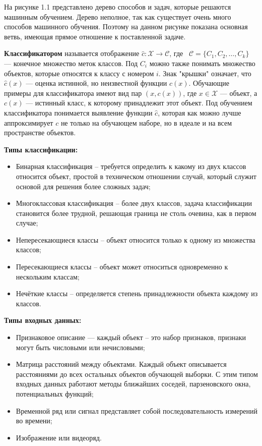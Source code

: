 На рисунке 1.1 представлено дерево способов и задач, которые решаются машинным обучением. Дерево неполное, так как существует очень много способов машинного обучения. Поэтому на данном рисунке показана основная ветвь, имеющая прямое отношение к поставленной задаче.

\textbf{Классификатором} называется отображение $\widehat{c}: \mathcal{X} \to \mathcal{C}$, где 
\
$\mathcal{C} = \{C_{1}, C_{2}, \dots, C_{k}\}$ — конечное множество меток классов. Под $C_{i}$ можно также понимать множество объектов, которые относятся к классу с номером $i$. Знак "крышки" означает, что $\widehat{c}(x)$ — оценка истинной, но неизвестной функции $c(x)$. Обучающие примеры для классификатора имеют вид пар $(x,c(x))$, где $x \in \mathcal{X}$ — объект, а $c(x)$ — истинный класс, к которому принадлежит этот объект. Под обучением классификатора понимается выявление функции $\widehat{c}$, которая как можно лучше аппроксимирует $c$ не только на обучающем наборе, но в идеале и на всем пространстве объектов.\cite{MLFLACH}

\textbf{Типы классификации:}
\begin{itemize}
  \item Бинарная классификация – требуется определить к какому из двух классов относится объект, простой в техническом отношении случай, который служит основой для решения более сложных задач;
  \item Многоклассовая классификация – более двух классов, задача классификации становится более трудной, решающая граница не столь очевина, как в первом случае;
  \item Непересекающиеся классы – объект относится только к одному из множества классов;
  \item Пересекающиеся классы – объект может относиться одновременно к нескольким классам;
  \item Нечёткие классы – определяется степень принадлежности объекта каждому из классов.
\end{itemize}

\textbf{Типы входных данных:}
\begin{itemize}
  \item Признаковое описание — каждый объект – это набор признаков, признаки могут быть числовыми или нечисловыми;
  \item Матрица расстояний между объектами. Каждый объект описывается расстояниями до всех остальных объектов обучающей выборки. С этим типом входных данных работают методы ближайших соседей, парзеновского окна, потенциальных функций;
  \item Временной ряд или сигнал представляет собой последовательность измерений во времени;
  \item Изображение или видеоряд.
\end{itemize}


